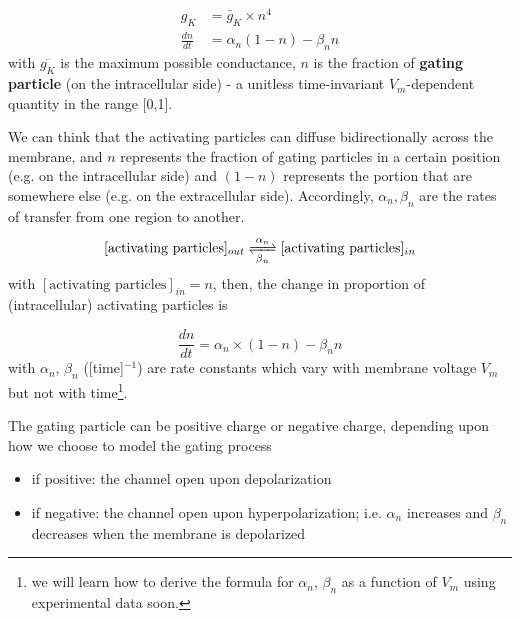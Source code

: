 \begin{equation}
\label{eq:59}
\begin{split}
g_K &= \bar{g}_K \times n^4 \\
\frac{dn}{dt} &= \alpha_n (1-n) - \beta_n n
\end{split}
\end{equation}
with $\overline{g_K}$ is the maximum possible conductance, $n$ is the
fraction of {\bf gating particle} (on the intracellular side) - a unitless
time-invariant $V_m$-dependent quantity in the range [0,1].

\begin{mdframed}

We can think that the activating particles can diffuse bidirectionally
across the membrane, and $n$ represents the fraction of gating particles in a
certain position (e.g. on the intracellular side) and $(1-n)$ represents the
portion that are somewhere else (e.g. on the extracellular side).
Accordingly, $\alpha_n, \beta_n$ are the rates of transfer from one region to
another.
\begin{equation}
  \label{eq:153}
  [\text{activating particles}]_{out} \ce{<=>[\alpha_n][\beta_n]}
  [\text{activating particles}]_{in}
\end{equation}
with $[\text{activating particles}]_{in}=n$, then, the change in
proportion of (intracellular) activating particles is

\begin{equation}
  \label{eq:152}
  \frac{dn}{dt} = \alpha_n \times (1-n) - \beta_n n
\end{equation}
with $\alpha_n$, $\beta_n$ ([time]$^{-1}$) are rate constants which
vary with membrane voltage $V_m$ but not with
time\footnote{we will learn how to derive the formula for $\alpha_n$,
$\beta_n$ as a function of $V_m$ using experimental data soon.}.

The gating particle can be positive charge or negative charge, depending upon
how we choose to model the gating process
\begin{itemize}
  \item if positive: the channel open upon depolarization
  \item if negative: the channel open upon hyperpolarization; i.e. $\alpha_n$
  increases and $\beta_n$ decreases when the membrane is depolarized
\end{itemize}
\end{mdframed}


